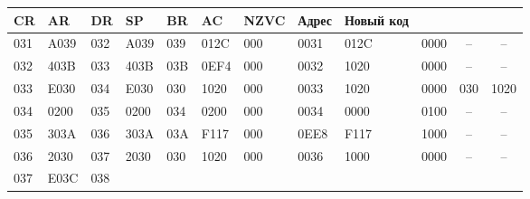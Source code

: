 \documentclass[12pt,onecolumn]{article}
\begin{document}
\begin{flushleft}
\begin{longtable}[c]{|ll|llllllll|cc|}
     \multicolumn{1}{l|}{CR} &
     \multicolumn{1}{l|}{AR} &
     \multicolumn{1}{l|}{DR} &
     \multicolumn{1}{l|}{SP} &
     \multicolumn{1}{l|}{BR} &
     \multicolumn{1}{l|}{AC} &
     NZVC &
     \multicolumn{1}{l|}{Адрес} &
     \multicolumn{1}{l|}{Новый код} \\ \hline
   \multicolumn{1}{|l|}{031} &
     A039 &
     \multicolumn{1}{l|}{032} &
     \multicolumn{1}{l|}{A039} &
     \multicolumn{1}{l|}{039} &
     \multicolumn{1}{l|}{012C} &
     \multicolumn{1}{l|}{000} &
     \multicolumn{1}{l|}{0031} &
     \multicolumn{1}{l|}{012C} &
     0000 &
     \multicolumn{1}{c|}{--} &
     -- \\ \hline
   \multicolumn{1}{|l|}{032} &
     403B &
     \multicolumn{1}{l|}{033} &
     \multicolumn{1}{l|}{403B} &
     \multicolumn{1}{l|}{03B} &
     \multicolumn{1}{l|}{0EF4} &
     \multicolumn{1}{l|}{000} &
     \multicolumn{1}{l|}{0032} &
     \multicolumn{1}{l|}{1020} &
     0000 &
     \multicolumn{1}{c|}{--} &
     -- \\ \hline
   \multicolumn{1}{|l|}{033} &
     E030 &
     \multicolumn{1}{l|}{034} &
     \multicolumn{1}{l|}{E030} &
     \multicolumn{1}{l|}{030} &
     \multicolumn{1}{l|}{1020} &
     \multicolumn{1}{l|}{000} &
     \multicolumn{1}{l|}{0033} &
     \multicolumn{1}{l|}{1020} &
     0000 &
     \multicolumn{1}{c|}{030} &
     1020 \\ \hline
   \multicolumn{1}{|l|}{034} &
     0200 &
     \multicolumn{1}{l|}{035} &
     \multicolumn{1}{l|}{0200} &
     \multicolumn{1}{l|}{034} &
     \multicolumn{1}{l|}{0200} &
     \multicolumn{1}{l|}{000} &
     \multicolumn{1}{l|}{0034} &
     \multicolumn{1}{l|}{0000} &
     0100 &
     \multicolumn{1}{c|}{--} &
     -- \\ \hline
   \multicolumn{1}{|l|}{035} &
     303A &
     \multicolumn{1}{l|}{036} &
     \multicolumn{1}{l|}{303A} &
     \multicolumn{1}{l|}{03A} &
     \multicolumn{1}{l|}{F117} &
     \multicolumn{1}{l|}{000} &
     \multicolumn{1}{l|}{0EE8} &
     \multicolumn{1}{l|}{F117} &
     1000 &
     \multicolumn{1}{c|}{--} &
     -- \\ \hline
   \multicolumn{1}{|l|}{036} &
     2030 &
     \multicolumn{1}{l|}{037} &
     \multicolumn{1}{l|}{2030} &
     \multicolumn{1}{l|}{030} &
     \multicolumn{1}{l|}{1020} &
     \multicolumn{1}{l|}{000} &
     \multicolumn{1}{l|}{0036} &
     \multicolumn{1}{l|}{1000} &
     0000 &
     \multicolumn{1}{c|}{--} &
     -- \\ \hline
   \multicolumn{1}{|l|}{037} &
     E03C &
     \multicolumn{1}{l|}{038} &

\end{longtable}
\end{flushleft}
\end{document}
